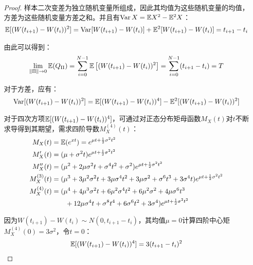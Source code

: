 \documentclass[11pt]{article}
\begin{document}
\begin{proof}
    样本二次变差为独立随机变量所组成，因此其均值为这些随机变量的均值，方差为这些随机变量方差之和。并且有$\operatorname{Var} X = \mathbb{E} X^2 - \mathbb{E}^2 X $：
    \begin{equation*}
        \mathbb{E} [(W(t_{i+1}) - W(t_{i}))^2] = \operatorname{Var} [W(t_{i+1}) - W(t_{i})] + \mathbb{E}^2 [W(t_{i+1}) - W(t_{i})]= t_{i+1} - t_{i}
    \end{equation*}

    由此可以得到：
    \begin{equation*}
        \lim\limits_{\left\lVert \Pi\right\rVert \rightarrow 0} \mathbb{E}(Q_{\Pi})
        = \sum_{i=0}^{N-1} \mathbb{E} \left[(W(t_{i+1}) - W(t_{i}))^2 \right]
        =  \sum_{i=0}^{N-1} (t_{i+1} - t_{i}) = T
    \end{equation*}

    对于方差，应有：
    \begin{equation*}
        \operatorname{Var} [(W(t_{i+1}) - W(t_{i}))^2] = \mathbb{E} [(W(t_{i+1}) - W(t_{i}))^4] - \mathbb{E}^2 [(W(t_{i+1}) - W(t_{i}))^2]
    \end{equation*}

    对于四次方项$\mathbb{E} [(W(t_{i+1}) - W(t_{i}))^4]$，可通过对正态分布矩母函数$M_X(t)$对$t$不断求导得到其期望，需求四阶导数$M_X^{(4)}(t)$：
    \begin{align*}
        M_X(t) &= \mathbb{E}(e^{xt}) = e^{\mu t + \frac{1}{2} \sigma^2 t^2} \\
        M'_X(t) &= (\mu + \sigma^2 t)e^{\mu t + \frac{1}{2} \sigma^2 t^2} \\
        M''_X(t) &= (\mu^2 + 2 \mu \sigma^2 t + \sigma^4 t^2 + \sigma^2)e^{\mu t +\frac{1}{2} \sigma^2 t^2} \\
        M^{(3)}_X(t) &= (\mu^3 + 3 \mu^2 \sigma^2 t + 3\mu \sigma^4 t^2 + 3\mu \sigma^2 + \sigma^6 t^3 + 3\sigma^4 t)e^{\mu t +\frac{1}{2} \sigma^2 t^2} \\
        M^{(4)}_X(t) &= (\mu^4 + 4 \mu^3 \sigma^2 t + 6 \mu^2 \sigma^4 t^2 + 6\mu^2 \sigma^2 + 4\mu\sigma^6 t^3 \\
        &\qquad + 12\mu\sigma^4 t + \sigma^8 t^4 + 6\sigma^6 t^2 + 3\sigma^4)e^{\mu t +\frac{1}{2} \sigma^2 t^2}
    \end{align*}

    因为$W(t_{i+1}) - W(t_{i}) \sim N(0,t_{i+1}-t_{i})$，其均值$\mu=0$计算四阶中心矩$M_X^{(4)}(0) = 3\sigma^2$，令$t=0$：
    \begin{equation*}
        \mathbb{E} [(W(t_{i+1}) - W(t_{i}))^4] = 3(t_{i+1}-t_{i})^2 
    \end{equation*}


\end{proof}
\end{document}
